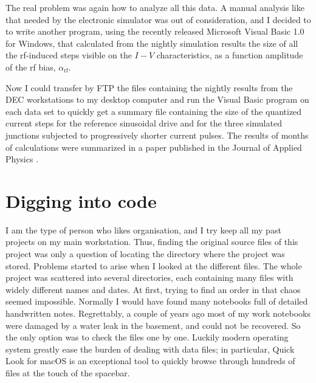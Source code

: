 The real problem was again how to analyze all this data. A manual analysis like that needed by the electronic simulator was out of consideration, and I decided to to write another program, using the recently released Microsoft Visual Basic 1.0 for Windows, that calculated from the nightly simulation results the size of all the rf-induced steps visible on the $I-V$ characteristics, as a function amplitude of the rf bias, $\alpha_\mathrm{rf}$.

Now I could transfer by FTP the files containing the nightly results from the DEC workstations to my desktop computer and run the Visual Basic program on each data set to quickly get a summary file containing the size of the quantized current steps for the reference sinusoidal drive and for the three simulated junctions subjected to progressively shorter current pulses.
The results of months of calculations were summarized in a paper published in the Journal of Applied Physics \cite{Maggi:1996}.



\section{Digging into code} \label{sec:digging-into-code}

I am the type of person who likes organisation, and I try keep all my past projects on my main workstation. 
Thus, finding the original source files of this project was only a question of locating the directory where the project was stored.
Problems started to arise when I looked at the different files. The whole project was scattered into several directories, each containing many files with widely different names and dates. At first, trying to find an order in that chaos seemed impossible.
Normally I would have found many notebooks full of detailed handwritten notes.
Regrettably, a couple of years ago most of my work notebooks were damaged by a water leak in the basement, and could not be recovered. 
So the only option was to check the files one by one. Luckily modern operating system greatly ease the burden of dealing with data files; in particular, Quick Look for macOS is an exceptional tool to quickly browse through hundreds of files at the touch of the spacebar.


